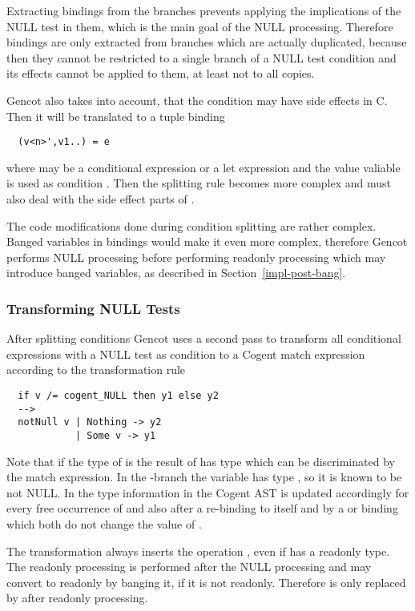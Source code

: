 Extracting bindings from the branches prevents applying the implications of the NULL test in them, which is the main goal of the NULL
processing. Therefore bindings are only extracted from branches which are actually duplicated, because then they cannot be restricted
to a single branch of a NULL test condition and its effects cannot be applied to them, at least not to all copies.

Gencot also takes into account, that the condition  may have side effects in C. Then it will be translated to a tuple binding
\begin{verbatim}
  (v<n>',v1..) = e
\end{verbatim}
where  may be a conditional expression or a let expression and the value valiable  is used as condition .
Then the splitting rule becomes more complex and must also deal with the side effect parts of .

The code modifications done during condition splitting are rather complex. Banged variables in bindings would make it even more complex,
therefore Gencot performs NULL processing before performing readonly processing which may introduce banged variables, as described in
Section~\ref{impl-post-bang}.

\subsubsection{Transforming NULL Tests}

After splitting conditions Gencot uses a second pass to transform all conditional expressions with a NULL test as condition to a Cogent
match expression according to the transformation rule
\begin{verbatim}
  if v /= cogent_NULL then y1 else y2
  -->
  notNull v | Nothing -> y2
            | Some v -> y1
\end{verbatim}
Note that if the type of  is  the result of  has type  which can be discriminated
by the match expression. In the -branch the variable  has type , so it is known to be not NULL. In 
the type information in the Cogent AST is updated accordingly for every free occurrence of  and also after a re-binding to itself
and by a  or  binding which both do not change the value of .

The transformation always inserts the operation , even if  has a readonly type. The readonly processing is performed
after the NULL processing and may convert  to readonly by banging it, if it is not readonly. Therefore  is
only replaced by  after readonly processing.

